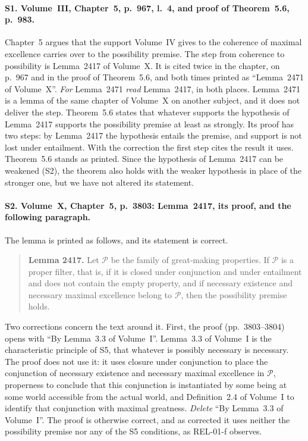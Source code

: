 \documentclass{situationist-preprint}
\begin{document}
\paragraph{S1. Volume~III, Chapter~5, p.~967, l.~4, and proof of Theorem~5.6, p.~983.} Chapter~5 argues that the support Volume~IV gives to the coherence of maximal excellence carries over to the possibility premise. The step from coherence to possibility is Lemma~2417 of Volume~X. It is cited twice in the chapter, on p.~967 and in the proof of Theorem~5.6, and both times printed as \enquote{Lemma~2471 of Volume~X}. \textit{For} Lemma~2471 \textit{read} Lemma~2417, in both places. Lemma~2471 is a lemma of the same chapter of Volume~X on another subject, and it does not deliver the step. Theorem~5.6 states that whatever supports the hypothesis of Lemma~2417 supports the possibility premise at least as strongly. Its proof has two steps: by Lemma~2417 the hypothesis entails the premise, and support is not lost under entailment. With the correction the first step cites the result it uses. Theorem~5.6 stands as printed. Since the hypothesis of Lemma~2417 can be weakened (S2), the theorem also holds with the weaker hypothesis in place of the stronger one, but we have not altered its statement.

\paragraph{S2. Volume~X, Chapter~5, p.~3803: Lemma~2417, its proof, and the following paragraph.} The lemma is printed as follows, and its statement is correct.

\begin{quote}\small
\textbf{Lemma 2417.} Let $\mathcal{P}$ be the family of great-making properties. If $\mathcal{P}$ is a proper filter, that is, if it is closed under conjunction and under entailment and does not contain the empty property, and if necessary existence and necessary maximal excellence belong to $\mathcal{P}$, then the possibility premise holds.
\end{quote}

Two corrections concern the text around it. First, the proof (pp.~3803--3804) opens with \enquote{By Lemma~3.3 of Volume~I}. Lemma~3.3 of Volume~I is the characteristic principle of S5, that whatever is possibly necessary is necessary. The proof does not use it: it uses closure under conjunction to place the conjunction of necessary existence and necessary maximal excellence in $\mathcal{P}$, properness to conclude that this conjunction is instantiated by some being at some world accessible from the actual world, and Definition~2.4 of Volume~I to identify that conjunction with maximal greatness. \textit{Delete} \enquote{By Lemma~3.3 of Volume~I}. The proof is otherwise correct, and as corrected it uses neither the possibility premise nor any of the S5 conditions, as REL-01-f observes.
\end{document}
